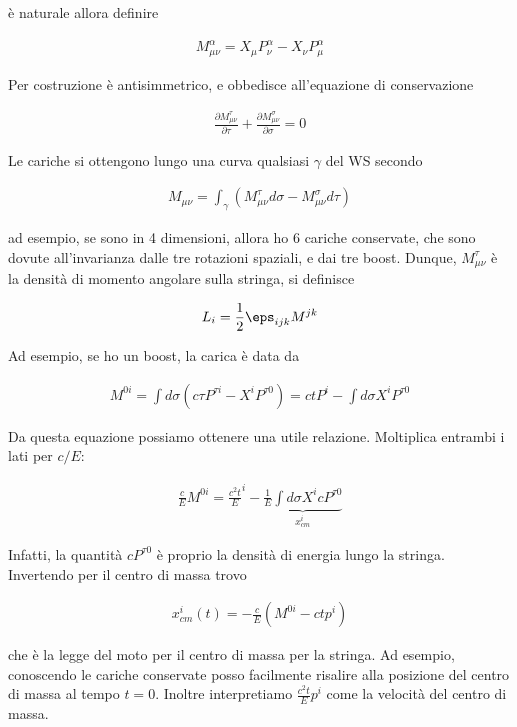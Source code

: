 \documentclass{report}
\begin{document}
è naturale allora definire 

\begin{align}
    M^\alpha_{\mu\nu} = X_\mu P^\alpha_\nu - X_\nu P^\alpha_\mu
\end{align}

Per costruzione è antisimmetrico, e obbedisce all'equazione di conservazione 

\begin{align}
    \frac{\partial M^\tau_{\mu\nu}}{\partial \tau} + \frac{\partial M^\sigma_{\mu\nu}}{\partial \sigma} = 0 
\end{align}

Le cariche si ottengono lungo una curva qualsiasi \(\gamma\) del WS secondo 

\begin{align}
    M_{\mu\nu} = \int_\gamma (M^\tau_{\mu\nu}d\sigma - M^\sigma_{\mu\nu}d\tau)
\end{align}

ad esempio, se sono in 4 dimensioni, allora ho 6 cariche conservate, che sono dovute all'invarianza dalle tre rotazioni spaziali, e dai tre boost. Dunque, \(M^\tau_{\mu\nu}\) è la densità di momento angolare sulla stringa, si definisce 

\begin{align}
    L_i = \frac{1}{2}\eps_{ijk}M^{jk}
\end{align}

Ad esempio, se ho un boost, la carica è data da 

\begin{align}
    M^{0i} = \int d\sigma (c\tau P^{\tau i} - X^i P^{\tau 0}) = ctP^i - \int d\sigma X^i P^{\tau 0}
\end{align}

Da questa equazione possiamo ottenere una utile relazione. Moltiplica entrambi i lati per \(c/E\): 

\begin{align}
    \frac{c}{E}M^{0i} = \frac{c^2 t}{E}^i -\underbrace{\frac{1}{E}\int d\sigma X^i cP^{\tau 0}}_{x^i_{cm}}
\end{align}

Infatti, la quantità \(cP^{\tau 0}\) è proprio la densità di energia lungo la stringa. Invertendo per il centro di massa trovo 

\begin{align}
    x^i_{cm}(t) = -\frac{c}{E}(M^{0i} - ctp^i)
\end{align}

che è la legge del moto per il centro di massa per la stringa. Ad esempio, conoscendo le cariche conservate posso facilmente risalire alla posizione del centro di massa al tempo \(t=0\). Inoltre interpretiamo \(\frac{c^2t}{E}p^i\) come la velocità del centro di massa. 
\end{document}
